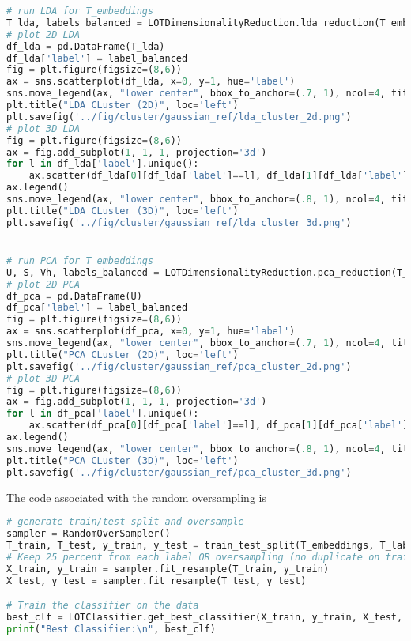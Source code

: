 \begin{lstlisting}[language=Python, caption=Code for PCA and LDA reduction., label={code:reduction}]
# run LDA for T_embeddings
T_lda, labels_balanced = LOTDimensionalityReduction.lda_reduction(T_embeddings, T_labels, n_components=3)
# plot 2D LDA
df_lda = pd.DataFrame(T_lda)
df_lda['label'] = label_balanced
fig = plt.figure(figsize=(8,6))
ax = sns.scatterplot(df_lda, x=0, y=1, hue='label')
sns.move_legend(ax, "lower center", bbox_to_anchor=(.7, 1), ncol=4, title=None, frameon=False)
plt.title("LDA CLuster (2D)", loc='left')
plt.savefig('../fig/cluster/gaussian_ref/lda_cluster_2d.png')
# plot 3D LDA
fig = plt.figure(figsize=(8,6))
ax = fig.add_subplot(1, 1, 1, projection='3d')
for l in df_lda['label'].unique():
    ax.scatter(df_lda[0][df_lda['label']==l], df_lda[1][df_lda['label']==l], df_lda[2][df_lda['label']==l],label=l)
ax.legend()
sns.move_legend(ax, "lower center", bbox_to_anchor=(.8, 1), ncol=4, title=None, frameon=False)
plt.title("LDA CLuster (3D)", loc='left')
plt.savefig('../fig/cluster/gaussian_ref/lda_cluster_3d.png')


# run PCA for T_embeddings
U, S, Vh, labels_balanced = LOTDimensionalityReduction.pca_reduction(T_embeddings, T_labels)
# plot 2D PCA
df_pca = pd.DataFrame(U)
df_pca['label'] = label_balanced
fig = plt.figure(figsize=(8,6))
ax = sns.scatterplot(df_pca, x=0, y=1, hue='label')
sns.move_legend(ax, "lower center", bbox_to_anchor=(.7, 1), ncol=4, title=None, frameon=False)
plt.title("PCA CLuster (2D)", loc='left')
plt.savefig('../fig/cluster/gaussian_ref/pca_cluster_2d.png')
# plot 3D PCA
fig = plt.figure(figsize=(8,6))
ax = fig.add_subplot(1, 1, 1, projection='3d')
for l in df_pca['label'].unique():
    ax.scatter(df_pca[0][df_pca['label']==l], df_pca[1][df_pca['label']==l], df_pca[2][df_pca['label']==l],label=l)
ax.legend()
sns.move_legend(ax, "lower center", bbox_to_anchor=(.8, 1), ncol=4, title=None, frameon=False)
plt.title("PCA CLuster (3D)", loc='left')
plt.savefig('../fig/cluster/gaussian_ref/pca_cluster_3d.png')

\end{lstlisting}



The code associated with the random oversampling is 

\begin{lstlisting}[language=Python, caption=Code for classification of teeth., label={code:classify}]
# generate train/test split and oversample
sampler = RandomOverSampler()
T_train, T_test, y_train, y_test = train_test_split(T_embeddings, T_labels, test_size=0.2, random_state=21)
# Keep 25 percent from each label OR oversampling (no duplicate on train and test)
X_train, y_train = sampler.fit_resample(T_train, y_train)
X_test, y_test = sampler.fit_resample(T_test, y_test)

# Train the classifier on the data
best_clf = LOTClassifier.get_best_classifier(X_train, y_train, X_test, y_test)
print("Best Classifier:\n", best_clf)
\end{lstlisting}




